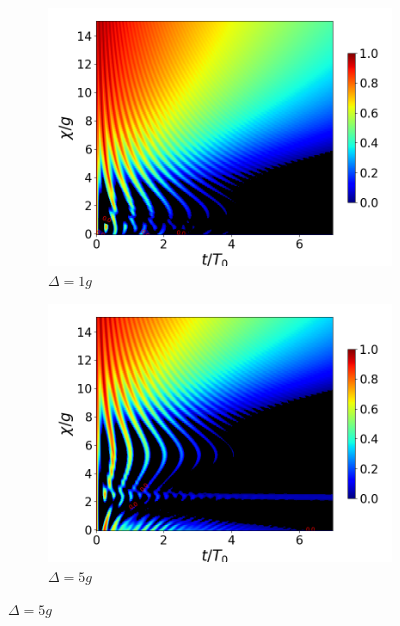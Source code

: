 \begin{figure}[h!]
\begin{subfigure}{0.49\textwidth}
        \caption{}
        \label{fig4:concu x 1 dis}
    \end{subfigure}
    \vfill
        \begin{subfigure}{0.49\textwidth}
        \includegraphics[width=\textwidth]{figuras/ch4/concu/chi/eg1+ge1 d=1.0g k=0.0g J=0.0g gamma=0.25g concu chi dis.png}
        \caption{$\Delta=1g$}
        \label{fig4:concu x 1 d1}
    \end{subfigure}
    \hfill
    \begin{subfigure}{0.49\textwidth}
        \includegraphics[width=\textwidth]{figuras/ch4/concu/chi/eg1+ge1 d=5.0g k=0.0g J=0.0g gamma=0.25g concu chi dis.png}
        \caption{$\Delta=5g$}
        \label{fig4:concu x 1 d2}
    \end{subfigure}

\end{figure}
